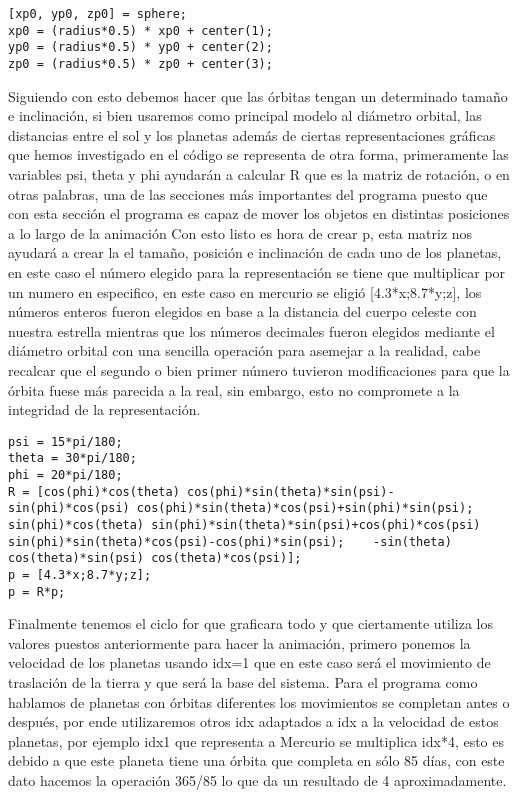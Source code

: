 \documentclass[12pt]{article}
\begin{document}
\begin{lstlisting}
[xp0, yp0, zp0] = sphere;
xp0 = (radius*0.5) * xp0 + center(1);
yp0 = (radius*0.5) * yp0 + center(2);
zp0 = (radius*0.5) * zp0 + center(3);
\end{lstlisting}
Siguiendo con esto debemos hacer que las órbitas tengan un determinado tamaño e inclinación, si bien usaremos como principal modelo al diámetro orbital, las distancias entre el sol y los planetas además de ciertas representaciones gráficas que hemos investigado en el código se representa de otra forma, primeramente las variables psi, theta y phi ayudarán a calcular R que es la matriz de rotación, o en otras palabras, una de las secciones más importantes del programa puesto que con esta sección el programa es capaz de mover los objetos en distintas posiciones a lo largo de la animación
Con esto listo es hora de crear p, esta matriz nos ayudará a crear la el tamaño, posición e inclinación de cada uno de los planetas, en este caso el número elegido para la representación se tiene que multiplicar por un numero en especifico, en este caso en mercurio se eligió [4.3*x;8.7*y;z], los números enteros fueron elegidos en base a la distancia del cuerpo celeste con nuestra estrella mientras que los números decimales fueron elegidos mediante el diámetro orbital con una sencilla operación para asemejar a la realidad, cabe recalcar que el segundo o bien primer número tuvieron modificaciones para que la órbita fuese más parecida a la real, sin embargo, esto no compromete a la integridad de la representación.
\begin{lstlisting}
psi = 15*pi/180;
theta = 30*pi/180;
phi = 20*pi/180;
R = [cos(phi)*cos(theta) cos(phi)*sin(theta)*sin(psi)-sin(phi)*cos(psi) cos(phi)*sin(theta)*cos(psi)+sin(phi)*sin(psi);    sin(phi)*cos(theta) sin(phi)*sin(theta)*sin(psi)+cos(phi)*cos(psi) sin(phi)*sin(theta)*cos(psi)-cos(phi)*sin(psi);    -sin(theta) cos(theta)*sin(psi) cos(theta)*cos(psi)];
p = [4.3*x;8.7*y;z];
p = R*p;
\end{lstlisting}
Finalmente tenemos el ciclo for que graficara todo y que ciertamente utiliza los valores puestos anteriormente para hacer la animación, primero ponemos la velocidad de los planetas usando idx=1 que en este caso será el movimiento de traslación de la tierra y que será la base del sistema. Para el programa como hablamos de planetas con órbitas diferentes los movimientos se completan antes o después, por ende utilizaremos otros idx adaptados a idx a la velocidad de estos planetas, por ejemplo idx1 que representa a Mercurio se multiplica idx*4, esto es debido a que este planeta tiene una órbita que completa en sólo 85 días, con este dato hacemos la operación 365/85 lo que da un resultado de 4 aproximadamente.
\end{document}
